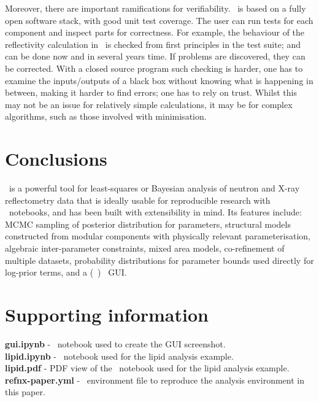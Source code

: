 \documentclass[pdf,preprint]{iucr}
\begin{document}
Moreover, there are important ramifications for verifiability. \ is based on a fully open software stack, with good unit test coverage. The user can run tests for each component and inspect parts for correctness. For example, the behaviour of the reflectivity calculation in \ is checked from first principles in the test suite; and can be done now and in several years time. If problems are discovered, they can be corrected. With a closed source program such checking is harder, one has to examine the inputs/outputs of a black box without knowing what is happening in between, making it harder to find errors; one has to rely on trust. Whilst this may not be an issue for relatively simple calculations, it may be for complex algorithms, such as those involved with minimisation.

\section{Conclusions}\label{conclusions}

\ is a powerful tool for least-squares or Bayesian analysis of neutron and X-ray reflectometry data that is ideally usable for reproducible research with \Jupyter\ notebooks, and has been built with extensibility in mind. Its features include: MCMC sampling of posterior distribution for parameters, structural models constructed from modular components with physically relevant parameterisation, algebraic inter-parameter constraints, mixed area models, co-refinement of multiple datasets, probability distributions for parameter bounds used directly for log-prior terms, and a (\Jupyter\ ) \ipywidgets\ GUI.



\section{Supporting information}

\noindent
\textbf{gui.ipynb} - \Jupyter\ notebook used to create the GUI screenshot.\\
\textbf{lipid.ipynb} - \Jupyter\ notebook used for the lipid analysis example.\\
\textbf{lipid.pdf} - PDF view of the \Jupyter\ notebook used for the lipid analysis example.\\
\textbf{refnx-paper.yml} - \conda\ environment file to reproduce the analysis environment in this paper.

{}

\end{document}
